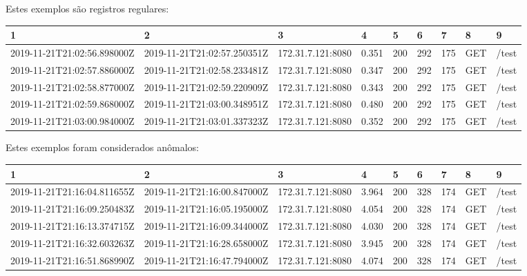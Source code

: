\begin{sidewaystable}[H]
\centering
\caption{Exemplos de registros regulares e anômalos do balanceador de carga.}
Estes exemplos são registros regulares:

\vspace{0.25cm}
\begin{tabular}{lllllllll}
1                           & 2                           & 3                 & 4     & 5   & 6   & 7   & 8   & 9     \\
\hline
2019-11-21T21:02:56.898000Z & 2019-11-21T21:02:57.250351Z & 172.31.7.121:8080 & 0.351 & 200 & 292 & 175 & GET & /test \\
2019-11-21T21:02:57.886000Z & 2019-11-21T21:02:58.233481Z & 172.31.7.121:8080 & 0.347 & 200 & 292 & 175 & GET & /test \\
2019-11-21T21:02:58.877000Z & 2019-11-21T21:02:59.220909Z & 172.31.7.121:8080 & 0.343 & 200 & 292 & 175 & GET & /test \\
2019-11-21T21:02:59.868000Z & 2019-11-21T21:03:00.348951Z & 172.31.7.121:8080 & 0.480 & 200 & 292 & 175 & GET & /test \\
2019-11-21T21:03:00.984000Z & 2019-11-21T21:03:01.337323Z & 172.31.7.121:8080 & 0.352 & 200 & 292 & 175 & GET & /test
\end{tabular}

\vspace{2cm}

Estes exemplos foram considerados anômalos:

\vspace{0.25cm}
\begin{tabular}{lllllllll}
1                           & 2                           & 3                 & 4     & 5   & 6   & 7   & 8   & 9     \\
\hline
2019-11-21T21:16:04.811655Z & 2019-11-21T21:16:00.847000Z & 172.31.7.121:8080 & 3.964 & 200 & 328 & 174 & GET & /test \\
2019-11-21T21:16:09.250483Z & 2019-11-21T21:16:05.195000Z & 172.31.7.121:8080 & 4.054 & 200 & 328 & 174 & GET & /test \\
2019-11-21T21:16:13.374715Z & 2019-11-21T21:16:09.344000Z & 172.31.7.121:8080 & 4.030 & 200 & 328 & 174 & GET & /test \\
2019-11-21T21:16:32.603263Z & 2019-11-21T21:16:28.658000Z & 172.31.7.121:8080 & 3.945 & 200 & 328 & 174 & GET & /test \\
2019-11-21T21:16:51.868990Z & 2019-11-21T21:16:47.794000Z & 172.31.7.121:8080 & 4.074 & 200 & 328 & 174 & GET & /test
\end{tabular}
\end{sidewaystable}

